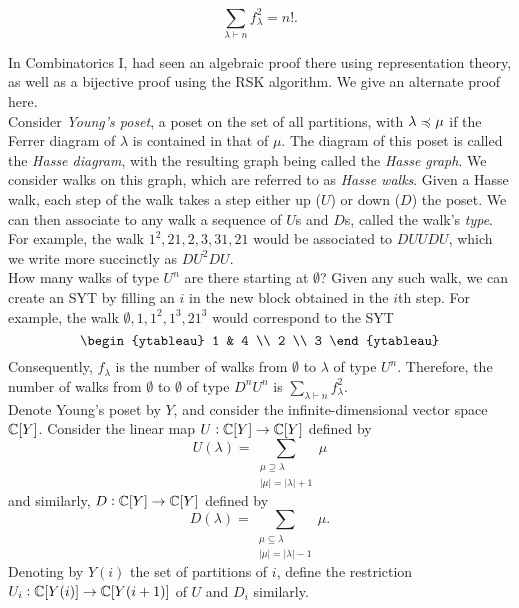 \begin{ftheo}
	\label{th7.5}
	\[ \sum_{\lambda \vdash n} f_\lambda^2 = n!. \]
\end{ftheo}

In Combinatorics I, had seen an algebraic proof there using representation theory, as well as a bijective proof using the RSK algorithm. We give an alternate proof here.\\
Consider \emph{Young's poset}, a poset on the set of all partitions, with $\lambda \preccurlyeq \mu$ if the Ferrer diagram of $\lambda$ is contained in that of $\mu$. The diagram of this poset is called the \emph{Hasse diagram}, with the resulting graph being called the \emph{Hasse graph}. We consider walks on this graph, which are referred to as \emph{Hasse walks}. Given a Hasse walk, each step of the walk takes a step either up ($U$) or down ($D$) the poset. We can then associate to any walk a sequence of $U$s and $D$s, called the walk's \emph{type}. For example, the walk $1^2,21,2,3,31,21$ would be associated to $DUUDU$, which we write more succinctly as $DU^2DU$.\\

How many walks of type $U^n$ are there starting at $\emptyset$? Given any such walk, we can create an SYT by filling an $i$ in the new block obtained in the $i$th step. For example, the walk $\emptyset,1,1^2,1^3,21^3$ would correspond to the SYT
\[ \begin{ytableau} 1 & 4 \\ 2 \\ 3 \end{ytableau} \]
Consequently, $f_\lambda$ is the number of walks from $\emptyset$ to $\lambda$ of type $U^n$. Therefore, the number of walks from $\emptyset$ to $\emptyset$ of type $D^nU^n$ is $\sum_{\lambda \vdash n} f_\lambda^2$.\\

Denote Young's poset by $Y$, and consider the infinite-dimensional vector space $\mathbb{C}[Y]$. Consider the linear map $U : \mathbb{C}[Y] \to \mathbb{C}[Y]$ defined by
\[ U(\lambda) = \sum_{\substack{\mu \supseteq \lambda \\ |\mu| = |\lambda|+1}} \mu \]
and similarly, $D : \mathbb{C}[Y] \to \mathbb{C}[Y]$ defined by
\[ D(\lambda) = \sum_{\substack{\mu \subseteq \lambda \\ |\mu| = |\lambda|-1}} \mu. \]
Denoting by $Y(i)$ the set of partitions of $i$, define the restriction $U_i : \mathbb{C}[Y(i)] \to \mathbb{C}[Y(i+1)]$ of $U$ and $D_i$ similarly.

